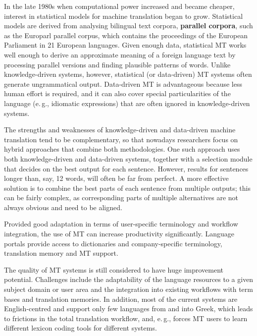 \begin{multicols}{2}
In the late 1980s when computational power increased and became cheaper, interest in statistical models for machine translation began to grow. Statistical models are derived from analysing bilingual text corpora, \textbf{parallel corpora}, such as the Europarl parallel corpus, which contains the proceedings of the European Parliament in 21 European languages. Given enough data, statistical MT works well enough to derive an approximate meaning of a foreign language text by processing parallel versions and finding plausible patterns of words. Unlike knowledge-driven systems, however, statistical (or data-driven) MT systems often generate ungrammatical output. Data-driven MT is advantageous because less human effort is required, and it can also cover special particularities of the language (e.\,g., idiomatic expressions) that are often ignored in knowledge-driven systems. 

The strengths and weaknesses of knowledge-driven and data-driven machine translation tend to be complementary, so that nowadays researchers focus on hybrid approaches that combine both methodologies. One such approach uses both knowledge-driven and data-driven systems, together with a selection module that decides on the best output for each sentence. However, results for sentences longer than, say, 12 words, will often be far from perfect. A more effective solution is to combine the best parts of each sentence from multiple outputs; this can be fairly complex, as corresponding parts of multiple alternatives are not always obvious and need to be aligned. 

Provided good adaptation in terms of user-specific terminology and workflow integration, the use of MT can increase productivity significantly. Language portals provide access to dictionaries and company-specific terminology, translation memory and MT support.


The quality of MT systems is still considered to have huge improvement potential. Challenges include the adaptability of the language resources to a given subject domain or user area and the integration into existing workflows with term bases and translation memories. In addition, most of the current systems are English-centred and support only few languages from and into Greek, which leads to frictions in the total translation workflow, and, e.\,g., forces MT users to learn different lexicon coding tools for different systems.


\end{multicols}
